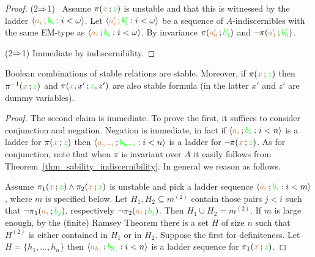 \begin{proof}
  (2$\Rightarrow$1) \ Assume $\pi({\color{brown} x}\,;{\color{green} z})$ is unstable and that this is witnessed by the ladder $\langle{\color{brown}a_i}\,;{\color{green} b_i} : i<\omega\rangle$.
  Let $\langle{\color{brown}a'_i}\,;{\color{green} b'_i} : i<\omega\rangle$ be a sequence of $A$-indiscernibles with the same EM-type as $\langle{\color{brown}a_i}\,;{\color{green} b_i} : i<\omega\rangle$.
  By invariance $\pi({\color{brown} a'_0}\,;{\color{green} b'_1})$ and $\neg\pi({\color{brown} a'_1}\,;{\color{green} b'_0})$.

  (2$\Rightarrow$1) Immediate by indiscernibility.
\end{proof}


\begin{lemma}\label{lem_stab_Boole}
  Boolean combinations of stable relations are stable.
  Moreover, if $\pi({\color{brown} x}\,;{\color{green} z})$ then  $\pi^{-1}({\color{brown} x}\,;{\color{green} z})$ and $\pi({\color{brown} x},x'\,;{\color{green} z},z')$ are also stable formula (in the latter $x'$ and $z'$ are dummy variables).
\end{lemma}

\begin{proof}
  The second claim is immediate.
  To prove the first, it suffices to consider conjunction and negation.
  Negation is immediate, in fact if $\langle{\color{brown}a_i}\,;{\color{green} b_i} : i<n\rangle$ is a ladder for $\pi({\color{brown} x}\,;{\color{green} z})$ then $\langle{\color{brown}a_{n-i}}\,;{\color{green} b_{n-i}} : i<n\rangle$ is a ladder for $\neg\pi({\color{brown} x}\,;{\color{green} z})$.
  As for conjunction, note that when $\pi$ is invariant over $A$ it easily follows from Theorem~\ref{thm_sability_indiscernibility}.
  In general we reason as follows.

  Assume $\pi_1({\color{brown} x}\,;{\color{green} z})\wedge\pi_2({\color{brown} x}\,;{\color{green} z})$ is unstable and pick a ladder sequence $\langle{\color{brown}a_i}\,;{\color{green} b_i} : i<m\rangle$, where $m$ is specified below.
  Let $H_1,H_2\subseteq m^{(2)}$ contain those pairs $j<i$ such that $\neg\pi_1({\color{brown} a_i}\,;{\color{green} b_j})$, respectively $\neg\pi_2({\color{brown} a_i}\,;{\color{green} b_j})$. 
  Then $H_1\cup H_2= m^{(2)}$. 
  If $m$ is large enough, by the (finite) Ramsey Theorem there is a set $H$ of size $n$ such that $H^{(2)}$ is either contained in $H_1$ or in $H_2$. Suppose the first for definiteness. 
  Let $H=\{h_1,\dots,h_n\}$ then $\langle{\color{brown}a_{h_i}}\,;{\color{green} b_{h_i}} : i<n\rangle$ is a ladder sequence for $\pi_1({\color{brown} x}\,;{\color{green} z})$.
\end{proof}

